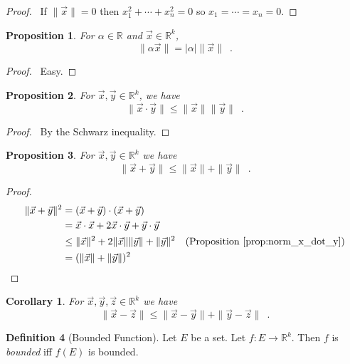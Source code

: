 \documentclass{book}
\let\qed\relax
\newtheorem{prop}{Proposition}[chapter]
\newtheorem{cor}{Corollary}[prop]
\theoremstyle{definition}
\newtheorem{df}[prop]{Definition}
\begin{document}
\begin{proof}
\pf\ If $\|\vec{x}\| = 0$ then $x_1^2 + \cdots + x_n^2 = 0$ so $x_1 = \cdots = x_n = 0$. \qed
\end{proof}

\begin{prop}
For $\alpha \in \mathbb{R}$ and $\vec{x} \in \mathbb{R}^k$,
\[ \| \alpha \vec{x} \| = |\alpha| \| \vec{x} \| \enspace . \]
\end{prop}

\begin{proof}
\pf\ Easy. \qed
\end{proof}

\begin{prop}
\label{prop:norm_x_dot_y}
For $\vec{x}, \vec{y} \in \mathbb{R}^k$, we have
\[ \| \vec{x} \cdot \vec{y} \| \leq \| \vec{x} \| \| \vec{y} \| \enspace . \]
\end{prop}

\begin{proof}
\pf\ By the Schwarz inequality. \qed
\end{proof}

\begin{prop}
For $\vec{x}, \vec{y} \in \mathbb{R}^k$ we have
\[ \| \vec{x} + \vec{y} \| \leq \| \vec{x} \| + \| \vec{y} \| \enspace . \]
\end{prop}

\begin{proof}
\pf
\begin{align*}
\| \vec{x} + \vec{y} \|^2 & = (\vec{x} + \vec{y}) \cdot (\vec{x} + \vec{y}) \\
& = \vec{x} \cdot \vec{x} + 2 \vec{x} \cdot \vec{y} + \vec{y} \cdot \vec{y} \\
& \leq \| \vec{x} \|^2 + 2 \| \vec{x} \| \| \vec{y} \| + \| \vec{y} \|^2 & (\text{Proposition \ref{prop:norm_x_dot_y}}) \\
& = (\| \vec{x} \| + \| \vec{y} \|)^2 & \qed
\end{align*}
\end{proof}

\begin{cor}
\label{cor:triangle_inequality}
For $\vec{x}, \vec{y}, \vec{z} \in \mathbb{R}^k$ we have
\[ \| \vec{x} - \vec{z} \| \leq \| \vec{x} - \vec{y} \| + \| \vec{y} - \vec{z} \| \enspace . \]
\end{cor}

\begin{df}[Bounded Function]
Let $E$ be a set. Let $f : E \rightarrow \mathbb{R}^k$. Then $f$ is \emph{bounded} iff $f(E)$ is bounded.
\end{df}
\end{document}
